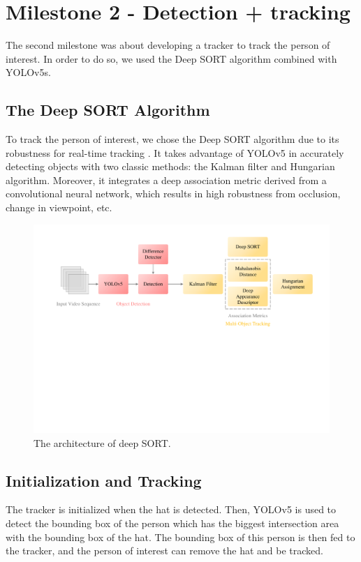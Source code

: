 \documentclass[10pt,conference,compsocconf]{IEEEtran}
\begin{document}
\section{Milestone 2 - Detection + tracking}
The second milestone was about developing a tracker to track the person of interest. In order to do so, we used the Deep SORT algorithm combined with YOLOv5s.

\subsection{The Deep SORT Algorithm}
To track the person of interest, we chose the Deep SORT algorithm due to its robustness for real-time tracking \cite{wojke2017simple}.
It takes advantage of YOLOv5 in accurately detecting objects with two classic methods: the Kalman filter and Hungarian algorithm.
Moreover, it integrates a deep association metric derived from a convolutional neural network, which results in high robustness from occlusion, change in viewpoint, etc.

\begin{figure}[!ht]
	\centering
	\includegraphics[width=0.9\linewidth]{Image/DeepSort.pdf}
	\caption{The architecture of deep SORT.}
    \label{fig:deepSORT}
\end{figure}

\subsection{Initialization and Tracking}
 The tracker is initialized when the hat is detected. Then, YOLOv5 is used to detect the bounding box of the person which has the biggest intersection area with the bounding box of the hat. The bounding box of this person is then fed to the tracker, and the person of interest can remove the hat and be tracked.
\end{document}
